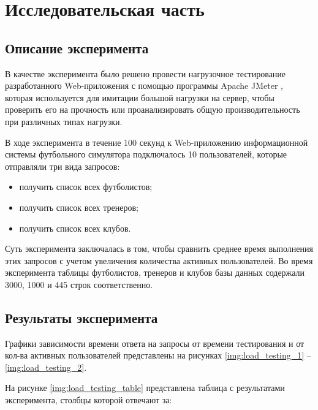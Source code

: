 \chapter{Исследовательская часть}

\section{Описание эксперимента}

В качестве эксперимента было решено провести нагрузочное тестирование разработанного Web-приложения с помощью программы Apache JMeter \cite{jmeter}, которая используется для имитации большой нагрузки на сервер, чтобы проверить его на прочность или проанализировать общую производительность при различных типах нагрузки.

В ходе эксперимента в течение 100 секунд к Web-приложению информационной системы футбольного симулятора подключалось 10 пользователей, которые отправляли три вида запросов:

\begin{itemize}
    \item получить список всех футболистов;
    \item получить список всех тренеров;
    \item получить список всех клубов.
\end{itemize}

Суть эксперимента заключалась в том, чтобы сравнить среднее время выполнения этих запросов с учетом увеличения количества активных пользователей. Во время эксперимента таблицы футболистов, тренеров и клубов базы данных содержали 3000, 1000 и 445 строк соответственно.

\clearpage

\section{Результаты эксперимента}

Графики зависимости времени ответа на запросы от времени тестирования и от кол-ва активных пользователей представлены на рисунках \ref{img:load_testing_1} -- \ref{img:load_testing_2}.


\clearpage

На рисунке \ref{img:load_testing_table} представлена таблица с результатами эксперимента, столбцы которой отвечают за:

